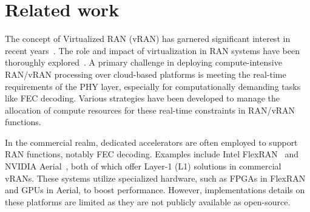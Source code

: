 \section{Related work}
\begin{table*}
  \caption{\\
  }
  \label{tab:related}
\end{table*}

The concept of Virtualized RAN (vRAN) has garnered significant interest in recent years~\cite{CiscoReimaging, IntelvRAN}. The role and impact of virtualization in RAN systems have been thoroughly explored~\cite{ORAN}. A primary challenge in deploying compute-intensive RAN/vRAN processing over cloud-based platforms is meeting the real-time requirements of the PHY layer, especially for computationally demanding tasks like FEC decoding. Various strategies have been developed to manage the allocation of compute resources for these real-time constraints in RAN/vRAN functions.

In the commercial realm, dedicated accelerators are often employed to support RAN functions, notably FEC decoding. Examples include Intel FlexRAN~\cite{flexran} and NVIDIA Aerial~\cite{Aerial}, both of which offer Layer-1 (L1) solutions in commercial vRANs. These systems utilize specialized hardware, such as FPGAs in FlexRAN and GPUs in Aerial, to boost performance. However, implementations details on these platforms are limited as they are not publicly available as open-source.

